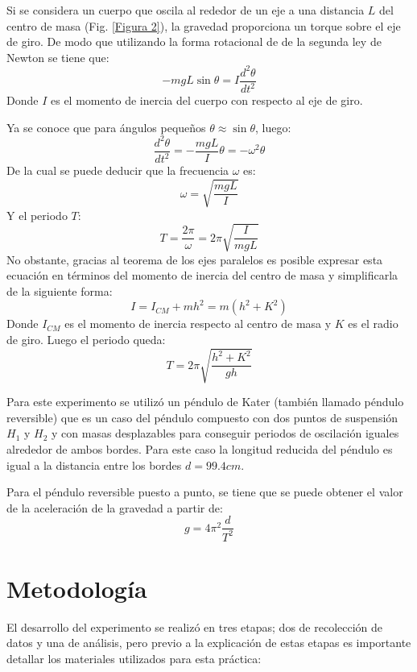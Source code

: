 \documentclass[spanish,notitlepage,letterpaper, 12pt]{article}
\begin{document}
Si se considera un cuerpo que oscila al rededor de un eje a una distancia $L$ del centro de masa (Fig. \ref{Figura 2}), la gravedad proporciona un torque sobre el eje de giro. De modo que utilizando la forma rotacional de de la segunda ley de Newton se tiene que:
\begin{equation}
    -mgL\sin{\theta}=I\frac{d^2\theta}{dt^2}
\end{equation}
Donde $I$ es el momento de inercia del cuerpo con respecto al eje de giro. \par
\bigskip
Ya se conoce que para ángulos pequeños $\theta\approx\sin{\theta}$, luego:
\begin{equation}
    \frac{d^2\theta}{dt^2}=-\frac{mgL}{I}\theta=-\omega^2\theta
\end{equation}
De la cual se puede deducir que la frecuencia $\omega$ es:
\begin{equation}
    \omega=\sqrt{\frac{mgL}{I}}
\end{equation}
Y el periodo $T$:
\begin{equation}
    T=\frac{2\pi}{\omega}=2\pi\sqrt{\frac{I}{mgL}}
\end{equation}
No obstante, gracias al teorema de los ejes paralelos \cite{serway_jewett_2017} es posible expresar esta ecuación en términos del momento de inercia del centro de masa y simplificarla de la siguiente forma:
\begin{equation}
    I=I_{CM}+mh^2=m(h^2+K^2)
\end{equation}
Donde $I_{CM}$ es el momento de inercia respecto al centro de masa y $K$ es el radio de giro. Luego el periodo queda:
\begin{equation}
    T=2\pi\sqrt{\frac{h^2+K^2}{gh}}
\end{equation}

Para este experimento se utilizó un péndulo de Kater (también llamado péndulo reversible) que es un caso del péndulo compuesto con dos puntos de suspensión $H_1$ y $H_2$ y con masas desplazables para conseguir periodos de oscilación iguales alrededor de ambos bordes. Para este caso la longitud reducida del péndulo es igual a la distancia entre los
bordes $d=99.4cm$. \par
\bigskip
Para el péndulo reversible puesto a punto, se tiene que se puede obtener el valor de la
aceleración de la gravedad a partir de:
\begin{equation}
    \label{eq:12}
    g=4\pi^2\frac{d}{T^2}
\end{equation}
\section{Metodología}
El desarrollo del experimento se realizó en tres etapas; dos de recolección de datos y una de análisis, pero previo a la explicación de estas etapas es importante detallar los materiales utilizados para esta práctica:
\end{document}
